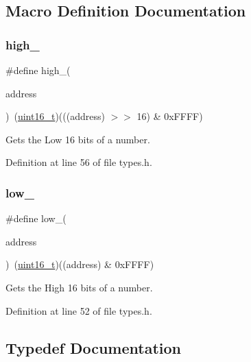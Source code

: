 \subsection{Macro Definition Documentation}
\mbox{\label{a00035_a0a63db19c3e2153ed419aeccf4e33c92_a0a63db19c3e2153ed419aeccf4e33c92}} 
\subsubsection{\texorpdfstring{high\+\_}{high\_16}}
{\footnotesize\ttfamily \#define high\+\_(\begin{DoxyParamCaption}\item[{}]{address }\end{DoxyParamCaption})~(\hyperlink{a00035_a273cf69d639a59973b6019625df33e30_a273cf69d639a59973b6019625df33e30}{uint16\+\_\+t})(((address) $>$$>$ 16) \& 0x\+F\+F\+F\+F)}



Gets the Low 16 bits of a number. 



Definition at line 56 of file types.\+h.

\mbox{\label{a00035_aded7ad58a4bedfffea10d5ae9c0c817e_aded7ad58a4bedfffea10d5ae9c0c817e}} 
\subsubsection{\texorpdfstring{low\+\_}{low\_16}}
{\footnotesize\ttfamily \#define low\+\_(\begin{DoxyParamCaption}\item[{}]{address }\end{DoxyParamCaption})~(\hyperlink{a00035_a273cf69d639a59973b6019625df33e30_a273cf69d639a59973b6019625df33e30}{uint16\+\_\+t})((address) \& 0x\+F\+F\+F\+F)}



Gets the High 16 bits of a number. 



Definition at line 52 of file types.\+h.



\subsection{Typedef Documentation}
\mbox{\label{a00035_aa0015d6dd7c46f7b7a2ff7b5bf407f5c_aa0015d6dd7c46f7b7a2ff7b5bf407f5c}} 
